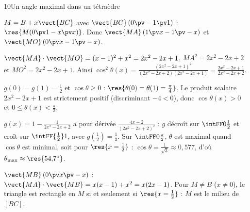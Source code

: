 \begin{corrige}{10}{Un angle maximal dans un tétraèdre}
\begin{questions}
  \item $M=B+x\vect{BC}$ avec $\vect{BC}\,(0\pv-1\pv1)$ : $\res{M(0\pv1-x\pv x)}$. Donc $\vect{MA}\,(1\pv x-1\pv-x)$ et
    $\vect{MO}\,(0\pv x-1\pv-x)$.
  \item $\vect{MA}\cdot\vect{MO}=(x-1)^2+x^2=2x^2-2x+1$, $MA^2=2x^2-2x+2$ et $MO^2=2x^2-2x+1$. Ainsi
    $\cos^2\theta(x)=\frac{(2x^2-2x+1)^2}{(2x^2-2x+2)(2x^2-2x+1)}=\frac{2x^2-2x+1}{2x^2-2x+2}$.
  \item $g(0)=g(1)=\frac12$ et $\cos\theta\geq0$ : $\res{\theta(0)=\theta(1)=\tfrac{\pi}{4}}$. Le produit scalaire
    $2x^2-2x+1$ est strictement positif (discriminant $-4<0$), donc $\cos\theta(x)>0$ et $0\leq\theta(x)<\frac\pi2$.
  \item $g(x)=1-\frac{1}{2x^2-2x+2}$ a pour dérivée $\frac{4x-2}{(2x^2-2x+2)^2}$ : $g$ décroît sur $\intFF0{\frac12}$ et croît sur
    $\intFF{\frac12}1$, avec $g\left(\frac12\right)=\frac13$. Sur $\intFF0{\frac\pi2}$, $\theta$ est maximal quand $\cos\theta$ est minimal,
    soit pour $\res{x=\tfrac12}$ : $\cos\theta=\frac{1}{\sqrt3}\approx0{,}577$, d'où $\theta_{\max}\approx\res{54{,}7^\circ}$.
  \item $\vect{MB}\,(0\pv x\pv-x)$ : $\vect{MA}\cdot\vect{MB}=x(x-1)+x^2=x(2x-1)$. Pour $M\neq B$ ($x\neq0$), le triangle est rectangle
    en $M$ si et seulement si $\res{x=\tfrac12}$ : $M$ est le milieu de $[BC]$.
\end{questions}
\end{corrige}

